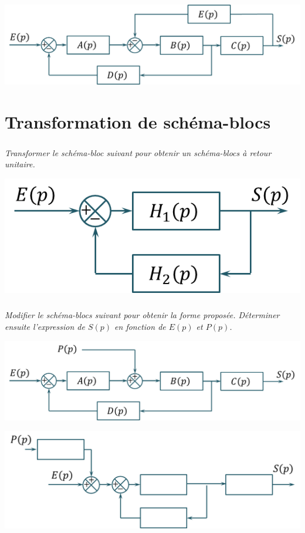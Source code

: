 \documentclass[10pt,fleqn]{article} %
\begin{document}
\begin{multicols}{2}
\begin{center}
\includegraphics[scale=.2]{images/sb_02}
\end{center}

\section*{Transformation de schéma-blocs}
\subparagraph*{}
\textit{Transformer le schéma-bloc suivant pour obtenir un schéma-blocs à retour unitaire.}
\begin{center}
\includegraphics[scale=.2]{images/sb_03}
\end{center}

\subparagraph*{}
\textit{Modifier le schéma-blocs suivant pour obtenir la forme proposée. Déterminer ensuite l'expression de $S(p)$ en fonction de $E(p)$ et $P(p)$.}
\begin{center}
\includegraphics[scale=.2]{images/sb_04}
\end{center}

\begin{center}
\includegraphics[scale=.2]{images/sb_05}
\end{center}

\end{multicols}
\end{document}
